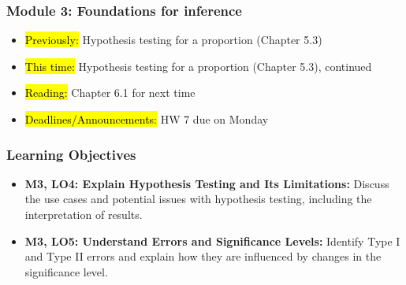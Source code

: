 
\begin{frame}
    \frametitle{Module 3: Foundations for inference}
    \begin{itemize}
        \item \hl{Previously: }Hypothesis testing for a proportion (Chapter 5.3)
        \item \hl{This time: }Hypothesis testing for a proportion (Chapter 5.3), continued
        \item \hl{Reading: }Chapter 6.1 for next time
        \item \hl{Deadlines/Announcements: }HW 7 due on Monday
    \end{itemize}
    
\end{frame}

\begin{frame}
    \frametitle{Learning Objectives}
    \begin{itemize}
        \item \textbf{M3, LO4: Explain Hypothesis Testing and Its Limitations:} Discuss the use cases and potential issues with hypothesis testing, including the interpretation of results.
        \item \textbf{M3, LO5: Understand Errors and Significance Levels:} Identify Type I and Type II errors and explain how they are influenced by changes in the significance level.
    \end{itemize}
\end{frame}
    
